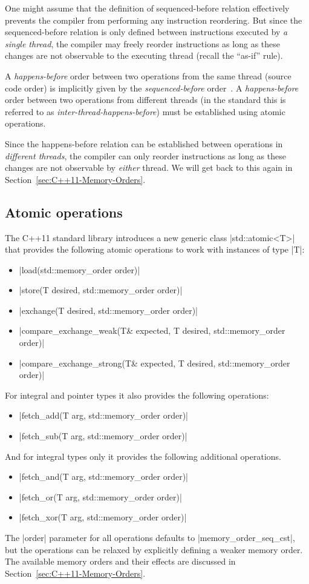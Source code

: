 \documentclass[a4paper,12pt,notitlepage,twoside,openright]{article}
\begin{document}
One might assume that the definition of sequenced-before relation
effectively prevents the compiler from performing any instruction
reordering. But since the sequenced-before relation is only defined
between instructions executed by \emph{a single thread}, the compiler
may freely reorder instructions as long as these changes are not
observable to the executing thread (recall the ``as-if'' rule).

A \emph{happens-before} order between two operations from the same
thread (source code order) is implicitly given by the
\emph{sequenced-before} order~\cite[1.10.12, p. 13]{c++11_standard}. A
\emph{happens-before} order between two operations from different
threads (in the standard this is referred to as
\emph{inter-thread-happens-before}) must be established using atomic
operations.

Since the happens-before relation can be established between operations
in \emph{different threads}, the compiler can only reorder instructions
as long as these changes are not observable by \emph{either} thread. We
will get back to this again in Section~\ref{sec:C++11-Memory-Orders}.

\subsection{Atomic operations}
The C++11 standard library introduces a new generic class
|std::atomic<T>| that provides the following atomic operations to work
with instances of type |T|:
\begin{itemize}
	\item |load(std::memory_order order)|
	\item |store(T desired, std::memory_order order)|
	\item |exchange(T desired, std::memory_order order)|
	\item |compare_exchange_weak(T& expected, T desired, std::memory_order order)|
	\item |compare_exchange_strong(T& expected, T desired, std::memory_order order)|
\end{itemize}
For integral and pointer types it also provides the following operations:
\begin{itemize}
	\item |fetch_add(T arg, std::memory_order order)|
	\item |fetch_sub(T arg, std::memory_order order)|
\end{itemize}
And for integral types only it provides the following additional operations.
\begin{itemize}
	\item |fetch_and(T arg, std::memory_order order)|
	\item |fetch_or(T arg, std::memory_order order)|
	\item |fetch_xor(T arg, std::memory_order order)|
\end{itemize}
The |order| parameter for all operations defaults to |memory_order_seq_cst|,
but the operations can be relaxed by explicitly defining a weaker memory
order. The available memory orders and their effects are discussed in
Section~\ref{sec:C++11-Memory-Orders}.
\end{document}
